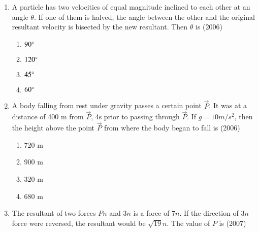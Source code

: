 \documentclass[journal]{IEEEtran}
\begin{document}
\begin{enumerate}
        \begin{multicols}{4} 
            \begin{enumerate}
                \item 1
                \item $\frac {9} {4}$
                \item $\frac {4} {9}$
                \item $\frac {2} {3}$
            \end{enumerate}
        \end{multicols}

    \item A particle has two velocities of equal magnitude inclined to
        each other at an angle $\theta$. If one of them is halved, the
        angle between the other and the original resultant velocity is
        bisected by the new resultant. Then $\theta$ is
        \hfill (2006)

        \begin{multicols}{4}
            \begin{enumerate}
                \item $90 \degree$
                \item $120 \degree$
                \item $45 \degree$
                \item $60 \degree$
            \end{enumerate}
        \end{multicols}

    \item A body falling from rest under gravity passes a certain
        point $\vec P$. It was at a distance of 400 m from $\vec P$,
        4s prior to passing through $\vec P$. If $g = 10 m/s^2$, then the
        height above the point $\vec P$ from where the body began to
        fall is
        \hfill (2006)

        \begin{multicols}{4}
            \begin{enumerate}
                \item 720 m
                \item 900 m 
                \item 320 m 
                \item 680 m 
            \end{enumerate} 
        \end{multicols}

    \item The resultant of two forces $Pn$ and $3n$ is a force of
        $7n$. If the direction of $3n$ force were reversed, the
        resultant would be $\sqrt{19}n$. The value of $P$ is
        \hfill (2007)


\end{enumerate}
\end{document}
